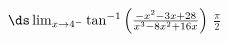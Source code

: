 {$\ds \lim_{x \to 4^-} \tan^{-1} \left ( \frac{-x^2-3x+28}{x^3-8x^2+16x} \right )$
}
{$\frac{\pi}{2}$
}